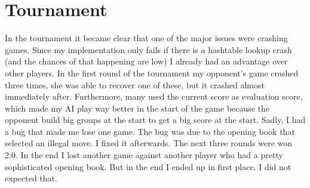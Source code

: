 \documentclass[a4paper]{article}
\begin{document}
\section{Tournament}
In the tournament it became clear that one of the major issues were crashing games. Since my implementation only fails if there is a hashtable lookup crash (and the chances of that happening are low) I already had an advantage over other players.
In the first round of the tournament my opponent's game crashed three times, she was able to recover one of these, but it crashed almost immediately after. Furthermore, many used the current score as evaluation score, which made my AI play way better in the start of the game because the opponent build big groups at the start to get a big score at the start.
Sadly, I had a bug that made me lose one game. The bug was due to the opening book that selected an illegal move. I fixed it afterwards. The next three rounds were won 2:0. In the end I lost another game against another player who had a pretty sophisticated opening book. But in the end I ended up in first place. I did not expected that.



\end{document}
